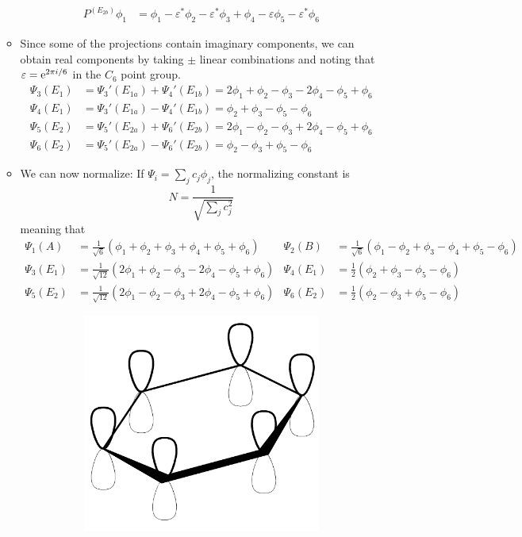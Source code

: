 \documentclass[../notes.tex]{subfiles}
\begin{document}
\begin{itemize}
\begin{itemize}
\begin{align*}
            P^{(E_{2b})}\phi_1 &= \phi_1-\varepsilon^*\phi_2-\varepsilon^*\phi_3+\phi_4-\varepsilon\phi_5  -\varepsilon^*\phi_6
        \end{align*}
        \item Since some of the projections contain imaginary components, we can obtain real components by taking $\pm$ linear combinations and noting that $\varepsilon=\e[2\pi i/6]$ in the $C_6$ point group.
        \begin{align*}
            \Psi_3(E_1) &= \Psi_3'(E_{1a})+\Psi_4'(E_{1b}) = 2\phi_1+\phi_2-\phi_3-2\phi_4-\phi_5+\phi_6\\
            \Psi_4(E_1) &= \Psi_3'(E_{1a})-\Psi_4'(E_{1b}) = \phi_2+\phi_3-\phi_5-\phi_6\\
            \Psi_5(E_2) &= \Psi_5'(E_{2a})+\Psi_6'(E_{2b}) = 2\phi_1-\phi_2-\phi_3+2\phi_4-\phi_5+\phi_6\\
            \Psi_6(E_2) &= \Psi_5'(E_{2a})-\Psi_6'(E_{2b}) = \phi_2-\phi_3+\phi_5-\phi_6
        \end{align*}
        \item We can now normalize: If $\Psi_i=\sum_jc_j\phi_j$, the normalizing constant is
        \begin{equation*}
            N = \frac{1}{\sqrt{\sum_jc_j^2}}
        \end{equation*}
        meaning that
        \begin{align*}
            \Psi_1(A) &= \frac{1}{\sqrt{6}}\left( \phi_1+\phi_2+\phi_3+\phi_4+\phi_5+\phi_6 \right)&
                \Psi_2(B) &= \frac{1}{\sqrt{6}}\left( \phi_1-\phi_2+\phi_3-\phi_4+\phi_5-\phi_6 \right)\\
            \Psi_3(E_1) &= \frac{1}{\sqrt{12}}\left( 2\phi_1+\phi_2-\phi_3-2\phi_4-\phi_5+\phi_6 \right)&
                \Psi_4(E_1) &= \frac{1}{2}\left( \phi_2+\phi_3-\phi_5-\phi_6 \right)\\
            \Psi_5(E_2) &= \frac{1}{\sqrt{12}}\left( 2\phi_1-\phi_2-\phi_3+2\phi_4-\phi_5+\phi_6 \right)&
                \Psi_6(E_2) &= \frac{1}{2}\left( \phi_2-\phi_3+\phi_5-\phi_6 \right)
        \end{align*}
        \begin{figure}[h!]
            \centering
            \begin{subfigure}[b]{0.25\linewidth}
                \centering
                \includegraphics[width=0.7\linewidth]{../ExtFiles/benzeneMOsa.png}

\end{subfigure}
\end{figure}
\end{itemize}
\end{itemize}
\end{document}
